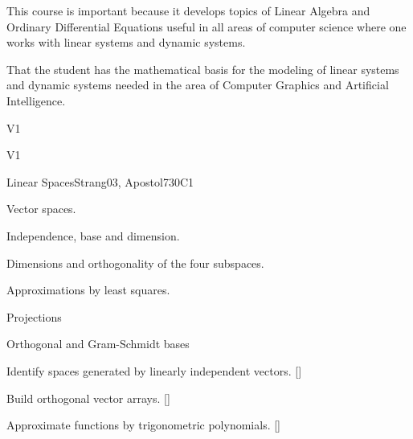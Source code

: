 \begin{syllabus}


\begin{justification}
   This course is important because it develops topics of Linear Algebra and Ordinary Differential Equations useful in all areas of computer science where one works with linear systems and dynamic systems.
\end{justification}

\begin{goals}
\item That the student has the mathematical basis for the modeling of linear systems and dynamic systems needed in the area of Computer Graphics and Artificial Intelligence.
\end{goals}

\begin{outcomes}{V1}
  \item {}
  \item {}
  \item {}
\end{outcomes}

\begin{competences}{V1}
    \item {} 
    \item {}
    \item {}
\end{competences}

\begin{unit}{}{Linear Spaces}{Strang03, Apostol73}{0}{C1}
\begin{topics}
      \item Vector spaces.
      \item Independence, base and dimension.
      \item Dimensions and orthogonality of the four subspaces.
      \item Approximations by least squares.
      \item Projections
      \item Orthogonal and Gram-Schmidt bases
   \end{topics}
   \begin{learningoutcomes}
      \item Identify spaces generated by linearly independent vectors. [\Usage]
      \item Build orthogonal vector arrays. [\Usage]
      \item Approximate functions by trigonometric polynomials. [\Usage]
   \end{learningoutcomes}
\end{unit}


\end{syllabus}
